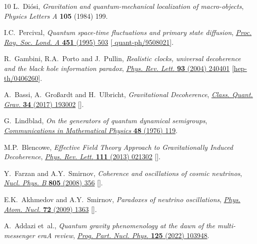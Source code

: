 \documentclass[11pt]{article}
\begin{document}
\begin{thebibliography}{10}
L.~Di{\'o}si, \emph{Gravitation and quantum-mechanical localization of
  macro-objects}, {\emph{Physics Letters A} {\bfseries 105} (1984) 199}.

I.C.~Percival, \emph{{Quantum space-time fluctuations and primary state
  diffusion}}, \href{https://doi.org/10.1098/rspa.1995.0139}{\emph{Proc. Roy.
  Soc. Lond. A} {\bfseries 451} (1995) 503}
  [\href{https://arxiv.org/abs/quant-ph/9508021}{{\ttfamily
  quant-ph/9508021}}].

R.~Gambini, R.A.~Porto and J.~Pullin, \emph{{Realistic clocks, universal
  decoherence and the black hole information paradox}},
  \href{https://doi.org/10.1103/PhysRevLett.93.240401}{\emph{Phys. Rev. Lett.}
  {\bfseries 93} (2004) 240401}
  [\href{https://arxiv.org/abs/hep-th/0406260}{{\ttfamily hep-th/0406260}}].

A.~Bassi, A.~Gro\ss{}ardt and H.~Ulbricht, \emph{{Gravitational Decoherence}},
  \href{https://doi.org/10.1088/1361-6382/aa864f}{\emph{Class. Quant. Grav.}
  {\bfseries 34} (2017) 193002}
  [\href{https://arxiv.org/abs/1706.05677}{{}}].

G.~Lindblad, \emph{On the generators of quantum dynamical semigroups},
  \href{https://doi.org/10.1007/BF01608499}{\emph{Communications in
  Mathematical Physics} {\bfseries 48} (1976) 119}.

M.P.~Blencowe, \emph{{Effective Field Theory Approach to Gravitationally
  Induced Decoherence}},
  \href{https://doi.org/10.1103/PhysRevLett.111.021302}{\emph{Phys. Rev. Lett.}
  {\bfseries 111} (2013) 021302}
  [\href{https://arxiv.org/abs/1211.4751}{{}}].

Y.~Farzan and A.Y.~Smirnov, \emph{{Coherence and oscillations of cosmic
  neutrinos}},
  \href{https://doi.org/10.1016/j.nuclphysb.2008.07.028}{\emph{Nucl. Phys. B}
  {\bfseries 805} (2008) 356}
  [\href{https://arxiv.org/abs/0803.0495}{{}}].

E.K.~Akhmedov and A.Y.~Smirnov, \emph{{Paradoxes of neutrino oscillations}},
  \href{https://doi.org/10.1134/S1063778809080122}{\emph{Phys. Atom. Nucl.}
  {\bfseries 72} (2009) 1363}
  [\href{https://arxiv.org/abs/0905.1903}{{}}].

A.~Addazi et~al., \emph{{Quantum gravity phenomenology at the dawn of the
  multi-messenger era\textemdash{}A review}},
  \href{https://doi.org/10.1016/j.ppnp.2022.103948}{\emph{Prog. Part. Nucl.
  Phys.} {\bfseries 125} (2022) 103948}.


\end{thebibliography}
\end{document}

